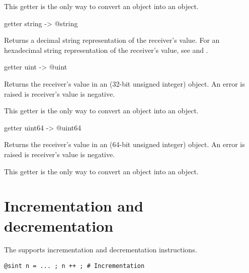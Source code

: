 This getter is the only way to convert an  object into an  object.






\begin{galgascode}
getter string -> @string
\end{galgascode}

Returns a decimal string representation of the receiver's value. For an hexadecimal string representation of the receiver's value, see  and .








\begin{galgascode}
getter uint -> @uint
\end{galgascode}

Returns the receiver's value in an  (32-bit unsigned integer) object. An error is raised is receiver's value is negative.

This getter is the only way to convert an  object into an  object.





\begin{galgascode}
getter uint64 -> @uint64
\end{galgascode}

Returns the receiver's value in an  (64-bit unsigned integer) object. An error is raised is receiver's value is negative.

This getter is the only way to convert an  object into an  object.





\section{Incrementation and decrementation}

The  supports incrementation and decrementation instructions.

\texttt{@sint n = ... ; n ++ ; \# Incrementation}

